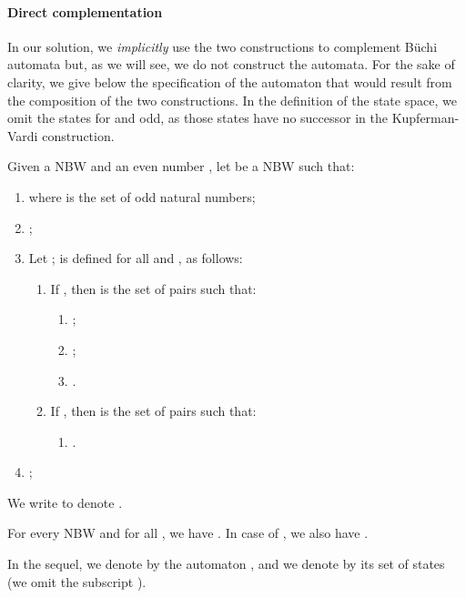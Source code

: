 \documentclass{LMCS}
\begin{document}
\paragraph{{\bf Direct complementation}}\label{sec:direct-complementation}
In our solution, we \emph{implicitly} use the two constructions to
complement B\"uchi automata but, as we will see, we do not construct
the automata. For the sake of clarity, we give below the
specification of the automaton that would result from the composition of
the two constructions. In the definition of the state space, we omit the
states  for  and  odd, as those states have no 
successor in the Kupferman-Vardi construction.
 


\begin{defi}\label{def:direct-complementation}
Given a NBW  
and an even number , let 
 be a NBW such that:
\begin{enumerate}[] 
\item  where
 is the set of odd natural numbers;
\item ;
\item Let ;  is defined for all  and 
, as follows:
\begin{enumerate}[] 
\item If , then  is the set of pairs  such that:
	\begin{enumerate}[] 
	\item ; 
	\item ;
\item .
\end{enumerate}
\item If , then  is the set of pairs  such that:
	\begin{enumerate}[]
	\item[] .
	\end{enumerate}
\end{enumerate} 
\item ;
\end{enumerate} 
\end{defi}

 We write  to 
denote .

\begin{thm}\label{theo:direct-complement}
For every NBW  and
for all , we have .  In case of , we
also have .
\end{thm}

In the sequel, we denote by  the automaton ,
and we denote by  its set of states (we omit the subscript ).
\end{document}
